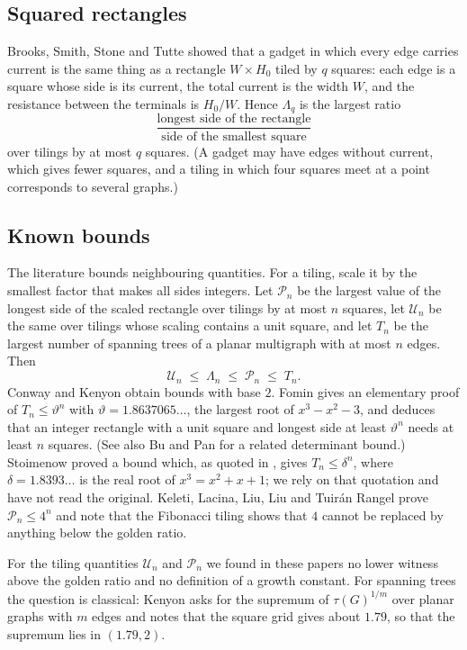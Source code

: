 \documentclass[11pt]{amsart}
\theoremstyle{plain}
\theoremstyle{definition}
\theoremstyle{remark}
\newcommand{\Lam}{\Lambda}
\begin{document}
\subsection*{Squared rectangles}
Brooks, Smith, Stone and Tutte \cite{BSST} showed that a gadget in which every edge carries current is the same
thing as a rectangle $W\times H_0$ tiled by $q$ squares: each edge is a square whose side is its current, the total
current is the width $W$, and the resistance between the terminals is $H_0/W$. Hence $\Lam_q$ is the largest ratio
\[
\frac{\text{longest side of the rectangle}}{\text{side of the smallest square}}
\]
over tilings by at most $q$ squares. (A gadget may have edges without current, which gives fewer squares, and a
tiling in which four squares meet at a point corresponds to several graphs.)

\subsection*{Known bounds}
The literature bounds neighbouring quantities. For a tiling, scale it by the smallest factor that makes all sides
integers. Let $\mathcal P_n$ be the largest value of the longest side of the scaled rectangle over tilings by at
most $n$ squares, let $\mathcal U_n$ be the same over tilings whose scaling contains a unit square, and let $T_n$
be the largest number of spanning trees of a planar multigraph with at most $n$ edges. Then
\[
\mathcal U_n\;\le\;\Lam_n\;\le\;\mathcal P_n\;\le\;T_n .
\]
Conway \cite{Conway} and Kenyon \cite{Kenyon} obtain bounds with base $2$. Fomin \cite{Fomin} gives an elementary
proof of $T_n\le\vartheta^n$ with $\vartheta=1.8637065\ldots$, the largest root of $x^3-x^2-3$, and deduces that
an integer rectangle with a unit square and longest side at least $\vartheta^n$ needs at least $n$ squares.
(See also Bu and Pan \cite{BuPan} for a related determinant bound.) Stoimenow \cite{Stoimenow} proved a bound which, as quoted in \cite{CKPknots}, gives $T_n\le\delta^n$, where
$\delta=1.8393\ldots$ is the real root of $x^3=x^2+x+1$; we rely on that quotation and have not read the original.
Keleti, Lacina, Liu, Liu and Tuir\'an Rangel \cite{Keleti} prove $\mathcal P_n\le4^n$ and note that the Fibonacci
tiling shows that $4$ cannot be replaced by anything below the golden ratio.

For the tiling quantities $\mathcal U_n$ and $\mathcal P_n$ we found in these papers no lower witness above the
golden ratio and no definition of a growth constant. For spanning trees the question is classical: Kenyon
\cite[Problem~2]{Kenyon} asks for the supremum of $\tau(G)^{1/m}$ over planar graphs with $m$ edges and notes that
the square grid gives about $1.79$, so that the supremum lies in $(1.79,2)$.
\end{document}
